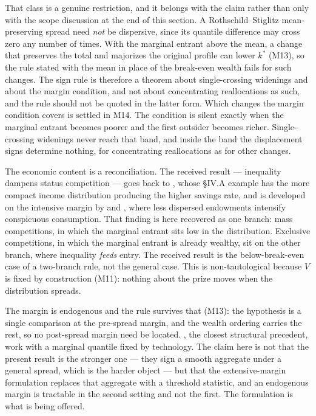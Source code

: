 \documentclass[11pt,a4paper]{article}
\begin{document}
That class is a genuine restriction, and it belongs with the claim rather than
only with the scope discussion at the end of this section. A
Rothschild--Stiglitz mean-preserving spread need \emph{not} be dispersive, since
its quantile difference may cross zero any number of times. With the marginal
entrant above the mean, a change that preserves the total and majorizes the
original profile can lower $k^*$ (M13),
so the rule stated with the mean in place of the break-even wealth fails for
such changes. The sign rule is therefore a theorem about single-crossing
widenings and about the margin condition, and not about concentrating
reallocations as such, and the rule
should not be quoted in the latter form. Which changes the margin condition
covers is settled in M14. The condition is silent exactly when
the marginal entrant becomes poorer and the first outsider becomes richer.
Single-crossing widenings never reach that band, and inside the band the
displacement signs determine nothing, for concentrating reallocations as for
other changes.

The economic content is a reconciliation. The received result --- inequality
dampens status competition --- goes back to
\citet{ColeMailathPostlewaite1992}, whose \S IV.A example has the more
compact income distribution producing the higher savings rate, and is
developed on the intensive margin by \citet{HopkinsKornienko2004} and
\citet{HopkinsKornienko2010}, where less dispersed endowments intensify
conspicuous consumption. That finding is here recovered as one branch: mass
competitions, in which the marginal entrant sits low in the distribution.
Exclusive competitions, in which the marginal entrant is already wealthy,
sit on the other branch, where inequality \emph{feeds} entry. The received
result is the below-break-even case of a two-branch rule, not the general case.
This is non-tautological because $V$ is fixed by construction
(M11): nothing about the prize moves when the distribution
spreads.

The margin is endogenous and the rule survives that
(M13): the hypothesis is a single comparison at
the pre-spread margin, and the wealth ordering carries the rest, so no
post-spread margin need be located. \citet{CostrellLoury2004}, the closest
structural precedent, work with a marginal quantile fixed by technology. The
claim here is not that the present result is the stronger one --- they sign a
smooth aggregate under a general spread, which is the harder object --- but
that the extensive-margin formulation replaces that aggregate with a
threshold statistic, and an endogenous margin is tractable in the second
setting and not the first. The formulation is what is being offered.
\end{document}

